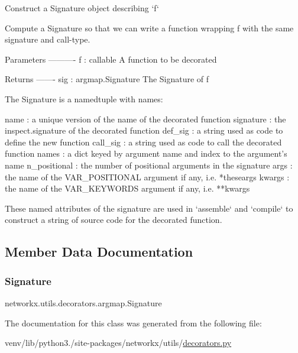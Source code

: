 \begin{DoxyVerb}Construct a Signature object describing `f`

Compute a Signature so that we can write a function wrapping f with
the same signature and call-type.

Parameters
----------
f : callable
    A function to be decorated

Returns
-------
sig : argmap.Signature
    The Signature of f

The Signature is a namedtuple with names:

    name : a unique version of the name of the decorated function
    signature : the inspect.signature of the decorated function
    def_sig : a string used as code to define the new function
    call_sig : a string used as code to call the decorated function
    names : a dict keyed by argument name and index to the argument's name
    n_positional : the number of positional arguments in the signature
    args : the name of the VAR_POSITIONAL argument if any, i.e. *theseargs
    kwargs : the name of the VAR_KEYWORDS argument if any, i.e. **kwargs

These named attributes of the signature are used in `assemble` and `compile`
to construct a string of source code for the decorated function.\end{DoxyVerb}
 

\subsection{Member Data Documentation}
\mbox{\label{classnetworkx_1_1utils_1_1decorators_1_1argmap_ad7f6fa78a07c0bf2eccc054492fd9677}} 
\subsubsection{\texorpdfstring{Signature}{Signature}}
{\footnotesize\ttfamily networkx.\+utils.\+decorators.\+argmap.\+Signature\hspace{0.3cm}{\ttfamily [static]}}



The documentation for this class was generated from the following file\+:\begin{DoxyCompactItemize}
\item 
venv/lib/python3./site-\/packages/networkx/utils/\hyperlink{networkx_2utils_2decorators_8py}{decorators.\+py}\end{DoxyCompactItemize}
